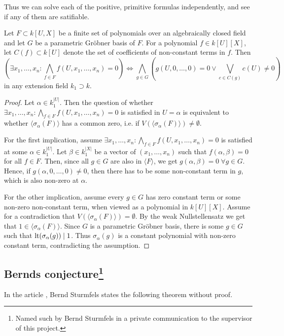 Thus we can solve each of the positive, primitive formulas independently, and see if any of them are satifiable.

\begin{theorem}
  Let $F \subset k[U, X]$ be a finite set of polynomials over an algebraically closed field and let $G$ be a parametric Gröbner basis of $F$. For a polynomial $f \in k[U][X]$, let $C(f) \subset k[U]$ denote the set of coefficients of non-constant terms in $f$. Then \[ \left(\exists x_{1}, \dots, x_{n} : \bigwedge_{f \in F} f(U, x_{1}, \dots, x_{n}) = 0 \right) \iff \bigwedge_{g \in G} \left( g(U, 0, \dots, 0) = 0 \lor \bigvee_{c \in C(g)} c(U) \neq 0 \right)\] in any extension field $k_{1} \supset k$.
\end{theorem}
\begin{proof}
  Let $\alpha \in k_{1}^{|U|}$. Then the question of whether $\exists x_{1}, \dots, x_{n} : \bigwedge_{f \in F} f(U, x_{1}, \dots, x_{n}) = 0$ is satisfied in $U = \alpha$ is equivalent to whether $\langle \sigma_{\alpha}(F) \rangle$ has a common zero, i.e. if $V(\langle \sigma_{\alpha}(F) \rangle) \neq \emptyset$.

  For the first implication, assume $\exists x_{1}, \dots, x_{n} : \bigwedge_{f \in F} f(U, x_{1}, \dots, x_{n}) = 0$ is satisfied at some $\alpha \in k_{1}^{|U|}$. Let $\beta \in k_{1}^{|X|}$ be a vector of $(x_{1}, \dots, x_{n})$ such that $f(\alpha, \beta) = 0$ for all $f \in F$. Then, since all $g \in G$ are also in $\langle F \rangle$, we get $g(\alpha, \beta) = 0 \; \forall g \in G$. Hence, if $g(\alpha, 0, \dots, 0) \neq 0$, then there has to be some non-constant term in $g$, which is also non-zero at $\alpha$.

  For the other implication, assume every $g \in G$ has zero constant term or some non-zero non-constant term, when viewed as a polynomial in $k[U][X]$. Assume for a contradiction that $V(\langle \sigma_{\alpha}(F) \rangle) = \emptyset$. By the weak Nullstellensatz we get that $1 \in \langle \sigma_{\alpha}(F) \rangle$. Since $G$ is a parametric Gröbner basis, there is some $g \in G$ such that $\operatorname{lt}(\sigma_{\alpha}(g)) \mid 1$. Thus $\sigma_{\alpha}(g)$ is a constant polynomial with non-zero constant term, contradicting the assumption.
\end{proof}










\subsection[Bernds conjecture]{Bernds conjecture\footnote{Named such by Bernd Sturmfels in a private communication to the supervisor of this project.}}
In the article \cite{sturmfels}, Bernd Sturmfels states the following theorem without proof.

